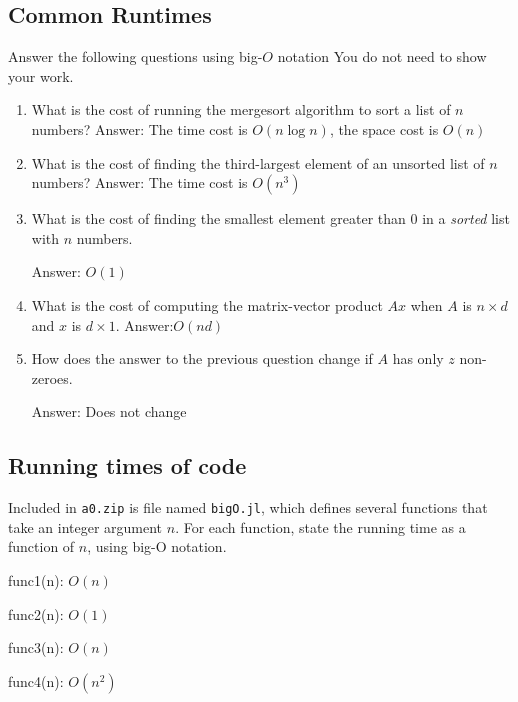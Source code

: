 \documentclass{article}
\def\blu#1{{\color{blu}#1}}
\begin{document}
\subsection{Common Runtimes}

\blu{Answer the following questions using big-$O$ notation} You do not need to show your work.
\begin{enumerate}
\item What is the cost of running the mergesort algorithm to sort  a list of $n$ numbers?
Answer: The time cost is $O(n\log n)$, the space cost is $O(n)$
\item What is the cost of finding the third-largest element of an unsorted list of $n$ numbers?
Answer: The time cost is $O(n^3)$
\item What is the cost of finding the smallest element greater than 0 in a \emph{sorted} list with $n$ numbers.

Answer: $O(1)$

\item What is the cost of computing the matrix-vector product $Ax$ when $A$ is $n \times d$ and $x$ is $d \times 1$.
Answer:$O(nd)$

\item How does the answer to the previous question change if $A$ has only $z$ non-zeroes.

Answer: Does not change
\end{enumerate}


\subsection{Running times of code}

Included in \texttt{a0.zip} is file named \texttt{bigO.jl}, which defines several functions
that take an integer argument $n$. For each function, \blu{state the running time as a function of $n$, using big-O notation}.


func1(n):
$O(n)$

func2(n):
$O(1)$



func3(n):
$O(n)$

func4(n):
$O(n^2)$
\end{document}
